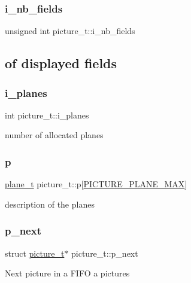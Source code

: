 \subsubsection{\texorpdfstring{i\+\_\+nb\+\_\+fields}{i\_nb\_fields}}
{\footnotesize\ttfamily unsigned int picture\+\_\+t\+::i\+\_\+nb\+\_\+fields}

\subsection*{of displayed fields}\mbox{\label{structpicture__t_a12306fa911b2406709ae39a3c1cd8564}} 
\subsubsection{\texorpdfstring{i\+\_\+planes}{i\_planes}}
{\footnotesize\ttfamily int picture\+\_\+t\+::i\+\_\+planes}

number of allocated planes \mbox{\label{structpicture__t_af31189ca20dbc6790415f499fb90ecd0}} 
\subsubsection{\texorpdfstring{p}{p}}
{\footnotesize\ttfamily \hyperlink{structplane__t}{plane\+\_\+t} picture\+\_\+t\+::p\mbox{[}\hyperlink{vlc__picture_8h_a7c01aa52d32a00e326ed109475556094}{P\+I\+C\+T\+U\+R\+E\+\_\+\+P\+L\+A\+N\+E\+\_\+\+M\+AX}\mbox{]}}

description of the planes \mbox{\label{structpicture__t_a24e14541fe992251a5f88a0f2dae9c7d}} 
\subsubsection{\texorpdfstring{p\+\_\+next}{p\_next}}
{\footnotesize\ttfamily struct \hyperlink{structpicture__t}{picture\+\_\+t}$\ast$ picture\+\_\+t\+::p\+\_\+next}

Next picture in a F\+I\+FO a pictures \mbox{\label{structpicture__t_a142c5b32188e3c5f5ba11612ddb92f01}} 
